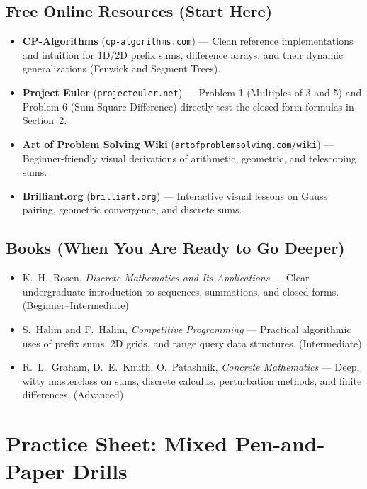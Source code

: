 \documentclass[11pt,a4paper]{article}
\theoremstyle{definition}
\begin{document}
\subsection*{Free Online Resources (Start Here)}
\begin{itemize}
    \item \textbf{CP-Algorithms} (\texttt{cp-algorithms.com}) --- Clean reference implementations and intuition for 1D/2D prefix sums, difference arrays, and their dynamic generalizations (Fenwick and Segment Trees).
    \item \textbf{Project Euler} (\texttt{projecteuler.net}) --- Problem 1 (Multiples of 3 and 5) and Problem 6 (Sum Square Difference) directly test the closed-form formulas in Section~2.
    \item \textbf{Art of Problem Solving Wiki} (\texttt{artofproblemsolving.com/wiki}) --- Beginner-friendly visual derivations of arithmetic, geometric, and telescoping sums.
    \item \textbf{Brilliant.org} (\texttt{brilliant.org}) --- Interactive visual lessons on Gauss pairing, geometric convergence, and discrete sums.
\end{itemize}

\subsection*{Books (When You Are Ready to Go Deeper)}
\begin{itemize}
    \item K.\ H.\ Rosen, \emph{Discrete Mathematics and Its Applications} --- Clear undergraduate introduction to sequences, summations, and closed forms. (Beginner--Intermediate)
    \item S.\ Halim and F.\ Halim, \emph{Competitive Programming} --- Practical algorithmic uses of prefix sums, 2D grids, and range query data structures. (Intermediate)
    \item R.\ L.\ Graham, D.\ E.\ Knuth, O.\ Patashnik, \emph{Concrete Mathematics} --- Deep, witty masterclass on sums, discrete calculus, perturbation methods, and finite differences. (Advanced)
\end{itemize}

\section*{Practice Sheet: Mixed Pen-and-Paper Drills}
\end{document}

